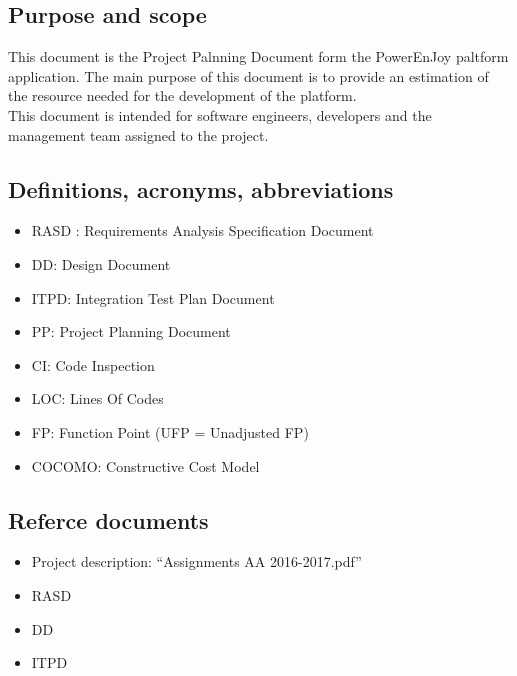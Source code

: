 \subsection{Purpose and scope}
This document is the Project Palnning Document form the PowerEnJoy paltform application. The main purpose of this document is to provide an estimation of the resource needed for the development of the platform.\\
This document is intended for software engineers, developers and the management team assigned to the project.\\

\subsection{Definitions, acronyms, abbreviations}
\begin{itemize}
		\item RASD : Requirements Analysis Specification Document
	 	\item DD: Design Document
	 	\item ITPD: Integration Test Plan Document
	 	\item PP: Project Planning Document
	 	\item CI: Code Inspection
		\item LOC: Lines Of Codes
		\item FP: Function Point (UFP = Unadjusted FP)
		\item COCOMO: Constructive Cost Model 
\end{itemize}

\subsection{Referce documents}
\begin{itemize}
		\item Project description: “Assignments AA 2016-2017.pdf”
	 	\item RASD
	 	\item DD
	 	\item ITPD
\end{itemize}
